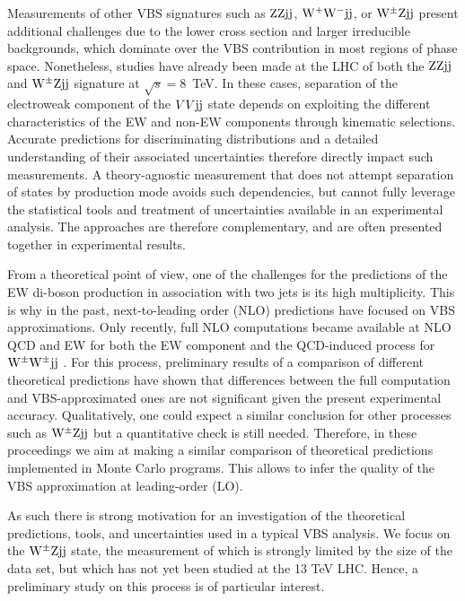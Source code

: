 \documentclass[11pt]{cernrep}
\begin{document}
Measurements of other VBS signatures such as ${\rm Z}{\rm Z}{\rm j}{\rm j}$, ${\rm W}^+{\rm W}^-{\rm j}{\rm j}$, or ${\rm W}^{\pm}{\rm Z}{\rm j}{\rm j}$ present additional challenges due to the lower cross section and larger irreducible backgrounds, which dominate over the VBS contribution in most regions of phase space.
Nonetheless, studies have already been made at the LHC of both the ${\rm Z}{\rm Z}{\rm j}{\rm j}$ \cite{Sirunyan:2017fvv} and ${\rm W}^{\pm}{\rm Z}{\rm j}{\rm j}$ \cite{Aad:2016ett} signature at $\sqrt{s} = 8$~TeV.
In these cases, separation of the electroweak component of the $VV{\rm j}{\rm j}$ state depends on exploiting the different characteristics of the EW and non-EW components through kinematic selections.
Accurate predictions for discriminating distributions and a detailed understanding of their associated uncertainties therefore directly impact such measurements.
A theory-agnostic measurement that does not attempt separation of states by production mode avoids such dependencies,
but cannot fully leverage the statistical tools and treatment of uncertainties available in an experimental analysis.
The approaches are therefore complementary, and are often presented together in experimental results.

From a theoretical point of view, one of the challenges for the predictions of the EW di-boson production in association with two jets is its high multiplicity.
This is why in the past, next-to-leading order (NLO) predictions have focused on VBS approximations.
Only recently, full NLO computations became available at NLO QCD and EW for both the EW component and the QCD-induced process for ${\rm W}^\pm{\rm W}^\pm{\rm j}{\rm j}$ \cite{Biedermann:2017bss}.
For this process, preliminary results \cite{Anders:2018gfr} of a comparison of different theoretical predictions have shown that differences between the full computation and VBS-approximated ones are not significant given the present experimental accuracy.
Qualitatively, one could expect a similar conclusion for other processes such as ${\rm W}^{\pm}{\rm Z}{\rm j}{\rm j}$ but a quantitative check is still needed.
Therefore, in these proceedings we aim at making a similar comparison of theoretical predictions implemented in Monte Carlo programs.
This allows to infer the quality of the VBS approximation at leading-order (LO).

As such there is strong motivation for an investigation of the theoretical predictions, tools, and uncertainties used in a typical VBS analysis. 
We focus on the ${\rm W}^{\pm}{\rm Z}{\rm j}{\rm j}$ \cite{Aad:2016ett} state, the measurement of which is strongly limited by the size of the data set, 
but which has not yet been studied at the 13 TeV LHC. Hence, a preliminary study on this process is of particular interest.
\end{document}
